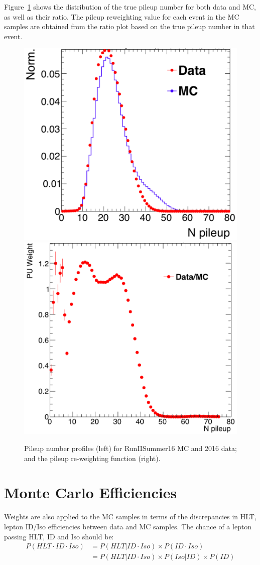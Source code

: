 \vspace{0.3cm}
Figure~\ref{fig:bg_pileup} shows the distribution of the true pileup number for both data and MC, as well as their ratio. The pileup reweighting value for each event in the MC samples are obtained from the ratio plot based on the true pileup number in that event.

\begin{figure}[htbp]
\begin{center}
\includegraphics[width=0.45\linewidth]{figures/bg_Npileup.png}
\includegraphics[width=0.45\linewidth]{figures/bg_pileupratio.png}
\caption{Pileup number profiles (left) for RunIISummer16 MC and 2016 data; and the pileup re-weighting function (right).}
\label{fig:bg_pileup}
\end{center}
\end{figure}

\section{Monte Carlo Efficiencies}
Weights are also applied to the MC samples in terms of the discrepancies in HLT, lepton ID/Iso efficiencies between data and MC samples. The chance of a lepton passing HLT, ID and Iso should be:
\begin{align*}
P(HLT\cdot ID\cdot Iso) & = P(HLT|ID\cdot Iso)\times P(ID\cdot Iso) \\
 & = P(HLT|ID\cdot Iso)\times P(Iso|ID)\times P(ID)
\end{align*}

